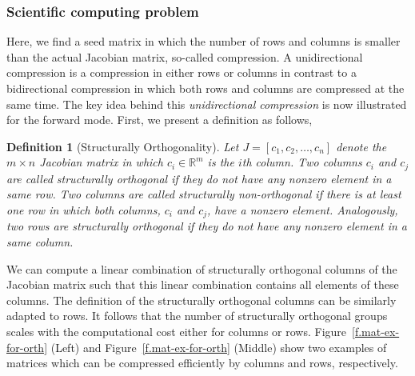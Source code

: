 \documentclass[12pt, twoside,a4paper,toc=bibliography]{scrbook}
\newtheorem{definition}{Definition}
\newcommand{\figref}[1]{Figure~\protect\ref{#1}}
\newcommand{\setR}{\ensuremath{\mathbb{R}}}
\begin{document}
\subsubsection{Scientific computing problem}
\label{ss.problem.full}
Here, we find a seed matrix in which
the number of rows and columns is smaller than the actual Jacobian matrix, so-called compression.
A unidirectional compression is a compression in either rows or columns in contrast to
a bidirectional compression in which both rows and columns are compressed at the same time.
The key idea behind this \emph{unidirectional compression} is now illustrated for the
forward mode. First, we present a definition as follows,
\begin{definition}[Structurally Orthogonality]
\label{d:struct_orth}
Let $J=[c_1, c_2, \dots, c_n]$ denote the $m\times n$ Jacobian matrix 
in which $c_i \in \setR^m$ is the $i$th
column. Two columns $c_i$ and $c_j$ are
called \emph{structurally orthogonal} if they do not have any nonzero element in a same
row. Two columns are called \emph{structurally non-orthogonal} if there is at least one
row in which both columns, $c_i$ and $c_j$, have a nonzero element.
Analogously, two rows are
\emph{structurally orthogonal} if they do not have any nonzero element in a same column.
\end{definition}
We can compute a linear combination of structurally orthogonal columns of the Jacobian matrix
such that this linear combination contains all elements of these columns.
The definition of the structurally orthogonal columns can be similarly adapted to rows. 
It follows that the number of structurally orthogonal groups scales 
with the computational cost either for columns or rows.
\figref{f.mat-ex-for-orth} (Left) and \figref{f.mat-ex-for-orth} (Middle) show two examples
of matrices which can be compressed efficiently by columns and rows, respectively.
\end{document}
